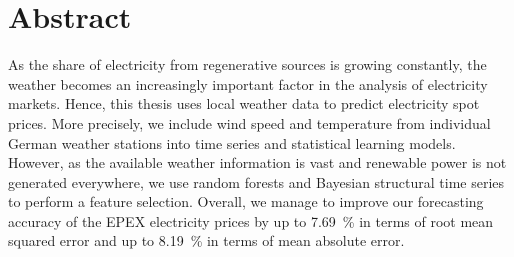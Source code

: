 \chapter*{Abstract}

\begin{center}
  \begin{minipage}{12cm}
    \begin{sloppypar}
		As the share of electricity from regenerative sources is growing constantly, the weather becomes an increasingly important factor in the analysis of electricity markets. Hence, this thesis uses local weather data to predict electricity spot prices. More precisely, we include wind speed and temperature from individual German weather stations into time series and statistical learning models. However, as the available weather information is vast and renewable power is not generated everywhere, we use random forests and Bayesian structural time series to perform a feature selection. Overall, we manage to improve our forecasting accuracy of the EPEX electricity prices by up to \SI{7.69}{\percent} in terms of root mean squared error and up to \SI{8.19}{\percent} in terms of mean absolute error.
    \end{sloppypar}
  \end{minipage}
\end{center}